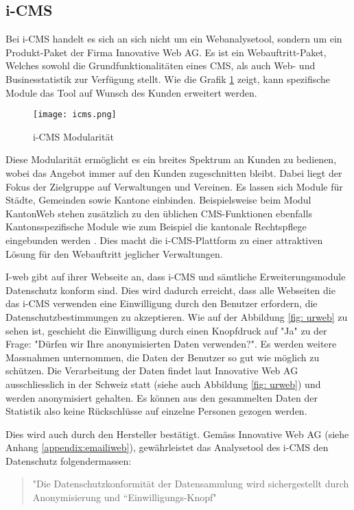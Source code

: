 \subsection{i-CMS}
Bei i-CMS handelt es sich an sich nicht um ein Webanalysetool, sondern um ein Produkt-Paket der Firma Innovative Web AG. Es ist ein Webauftritt-Paket, Welches sowohl die Grundfunktionalitäten eines CMS, als auch Web- und Businesstatistik zur Verfügung stellt\parencite{iwebwebsiteCMS}. Wie die Grafik \ref{fig: icms} zeigt, kann spezifische Module das Tool auf Wunsch des Kunden erweitert werden.


\begin{figure}[h]
  \centering
  \texttt{[image: icms.png]}
  \caption{i-CMS Modularität \parencite{iweb2019revue}}
  \label{fig: icms}
\end{figure}

Diese Modularität ermöglicht es ein breites Spektrum an Kunden zu bedienen, wobei das Angebot immer auf den Kunden zugeschnitten bleibt. Dabei liegt der Fokus der Zielgruppe auf Verwaltungen und Vereinen. Es lassen sich Module für Städte, Gemeinden sowie Kantone einbinden. Beispielsweise beim Modul KantonWeb stehen zusätzlich zu den üblichen CMS-Funktionen ebenfalls Kantonsspezifische Module wie zum Beispiel die kantonale Rechtspflege eingebunden werden \parencite{iwebwebsiteKanotonWeb}. Dies macht die i-CMS-Plattform zu einer attraktiven Lösung für den Webauftritt jeglicher Verwaltungen. 

I-web gibt auf ihrer Webseite \parencite{iwebwebsiteKanotonWeb} an, dass i-CMS und sämtliche Erweiterungsmodule Datenschutz konform sind. Dies wird dadurch erreicht, dass alle Webseiten die das i-CMS verwenden eine Einwilligung durch den Benutzer erfordern, die Datenschutzbestimmungen zu akzeptieren. Wie auf der Abbildung \ref{fig: urweb} zu sehen ist, geschieht die Einwilligung durch einen Knopfdruck auf "Ja" zu der Frage: "Dürfen wir Ihre anonymisierten Daten verwenden?". Es werden weitere Massnahmen unternommen, die Daten der Benutzer so gut wie möglich zu schützen. Die Verarbeitung der Daten findet laut Innovative Web AG \parencite{iwebwebsiteCMS} ausschliesslich in der Schweiz statt (siehe auch Abbildung \ref{fig: urweb}) und werden anonymisiert gehalten. Es können aus den gesammelten Daten der Statistik also keine Rückschlüsse auf einzelne Personen gezogen werden. 

Dies wird auch durch den Hersteller bestätigt. Gemäss Innovative Web AG (siehe Anhang \ref{appendix:emailiweb}), gewährleistet das Analysetool des i-CMS den Datenschutz folgendermassen:
\begin{quote}
  "Die Datenschutzkonformität der Datensammlung wird sichergestellt durch Anonymisierung und “Einwilligungs-Knopf"
\end{quote}

